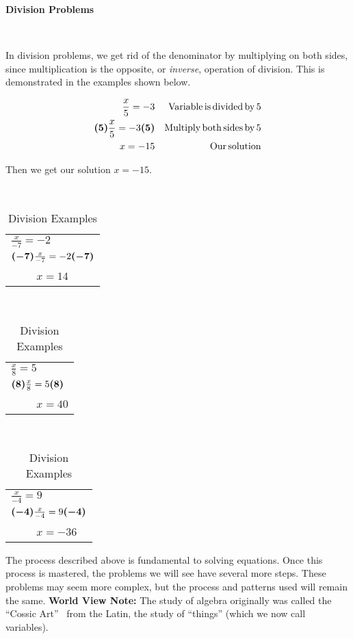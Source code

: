 {\textbf{Division Problems}}\par
~\par
In division problems, we get rid of the denominator by multiplying on both
sides, since multiplication is the opposite, or \textit{inverse}, operation of division. This is demonstrated in the examples shown below.

\begin{example}\label{Lin11}
  \begin{eqnarray*}
    \frac{x}{5} = - 3 &  & \operatorname{Variable} \operatorname{is} \operatorname{divided} \operatorname{by}
    5\\
    \boldsymbol{(5)} \frac{x}{5} = - 3 \boldsymbol{(5)} &  & \operatorname{Multiply}
    \operatorname{both} \operatorname{sides} \operatorname{by} 5\\
    x = - 15 &  & \operatorname{Our} \operatorname{solution}
  \end{eqnarray*}
\end{example}

Then we get our solution $x = - 15$. %

\pagebreak

\begin{example}\label{Lin12}
~\end{example}

\begin{table}[h]
  \begin{tabular}{l}
    $ \frac{x}{- 7} = - 2$\\
    $\boldsymbol{(-7)}\frac{x}{- 7} = - 2\boldsymbol{(-7)}$\\
    ~~~~ $x = 14$
  \end{tabular} \ \ \ \ \ \ \ \ \ \ \ \ \ \ \begin{tabular}{l}
    $ \frac{x}{8} = 5$\\
    $\boldsymbol{(8)} \frac{x}{8} = 5 \boldsymbol{(8)}$\\
    ~~~~ $x = 40$
  \end{tabular} \ \ \ \ \ \ \ \ \ \ \ \ \ \ \begin{tabular}{l}
    $ \frac{x}{- 4} = 9$\\
    $\boldsymbol{(-4)}\frac{x}{- 4} = 9\boldsymbol{(-4)}$\\
    ~~~~ $x = - 36$
  \end{tabular}
  \caption{Division Examples}
\end{table}

The process described above is fundamental to solving equations. Once this
process is mastered, the problems we will see have several more steps. These
problems may seem more complex, but the process and patterns used will remain
the same.\pp
{\textbf{World View Note: }}The study of algebra originally was called the
``Cossic Art'' \ from the Latin, the study of ``things'' (which we now call
variables).
